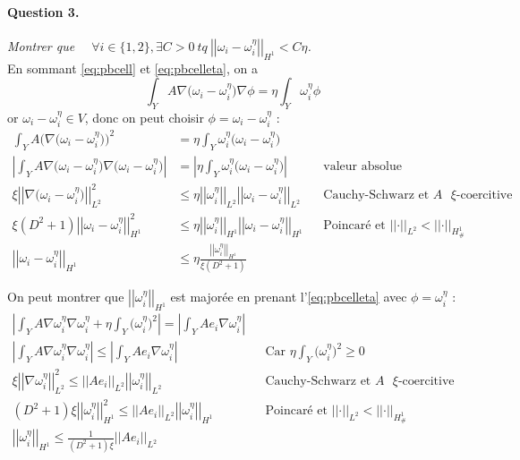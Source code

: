 \documentclass[11pt]{article}
\newcommand{\norm}[1]{\left|\left|#1\right|\right|}
\newcommand{\question}[2]{\paragraph{Question #1.}\textit{#2} \\}
\newcommand{\Hd}{H^1_{\#}}
\begin{document}
\question{3}{Montrer que $\quad\forall i \in \{1,2\}, \exists C>0 ~tq~ \norm{\omega_i-\omega_i^\eta}_{H^1} < C \eta$.}
En sommant \autoref{eq:pbcell} et \autoref{eq:pbcelleta}, on a
\[
  \int_Y A \nabla \big(\omega_i-\omega_i^\eta\big) \nabla \phi = \eta \int_Y \omega_i^\eta \phi
\]
or $\omega_i-\omega_i^\eta\in V$, donc on peut choisir $\phi=\omega_i-\omega_i^\eta$ :
\begin{align*}
  \int_Y A \big(\nabla \big(\omega_i-\omega_i^\eta\big)\big)^2
  &= \eta \int_Y \omega_i^\eta \big(\omega_i-\omega_i^\eta\big) \\
  \left| \int_Y A \nabla \big(\omega_i-\omega_i^\eta\big) \nabla \big(\omega_i-\omega_i^\eta\big) \right|
  &= \left| \eta \int_Y \omega_i^\eta \big(\omega_i-\omega_i^\eta\big) \right| && \text{valeur absolue} \\
  \xi \norm{\nabla \big(\omega_i-\omega_i^\eta \big)}_{L^2}^2
  &\leq \eta \norm{\omega_i^\eta}_{L^2} \norm{\omega_i-\omega_i^\eta}_{L^2} && \text{Cauchy-Schwarz et $A$ $\xi$-coercitive} \\
  \xi (D^2+1) \norm{\omega_i-\omega_i^\eta }_{H^1}^2 &\leq \eta \norm{\omega_i^\eta}_{H^1} \norm{\omega_i-\omega_i^\eta }_{H^1} && \text{Poincaré et }\norm{\cdot}_{L^2}<\norm{\cdot}_{\Hd} \\
  \norm{\omega_i-\omega_i^\eta }_{H^1} &\leq \eta \frac{\norm{\omega_i^\eta}_{H^1}}{\xi (D^2+1)}
\end{align*}

On peut montrer que $\norm{\omega_i^\eta}_{H^1}$ est majorée en prenant l'\autoref{eq:pbcelleta} avec $\phi=\omega_i^\eta$ :
\begin{align*}
  \left| \int_Y A \nabla \omega_i^\eta \nabla \omega_i^\eta  + \eta \int_Y \big(\omega_i^\eta\big)^2 \right|  = \left|\int_Y A e_i \nabla \omega_i^\eta\right| \\
  \left| \int_Y A \nabla \omega_i^\eta \nabla \omega_i^\eta \right| \leq \left|\int_Y A e_i \nabla \omega_i^\eta\right| && \text{Car }\eta\int_Y \big(\omega_i^\eta\big)^2 \geq  0 \\
  \xi \norm{\nabla \omega_i^\eta}_{L^2}^2 \leq \norm{A e_i}_{L^2} \norm{ \omega_i^\eta}_{L^2} && \text{Cauchy-Schwarz et $A$ $\xi$-coercitive} \\
  (D^2+1) \xi \norm{\omega_i^\eta}_{H^1}^2 \leq \norm{A e_i}_{L^2}\norm{\omega_i^\eta}_{H^1} && \text{Poincaré et }\norm{\cdot}_{L^2}<\norm{\cdot}_{\Hd}\\
  \norm{\omega_i^\eta}_{H^1} \leq \frac{1}{(D^2+1) \xi}\norm{A e_i}_{L^2}
\end{align*}
\end{document}
